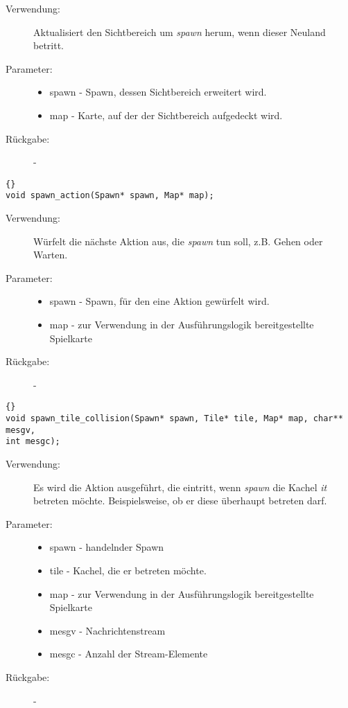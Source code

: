 \documentclass[11pt,a4paper,notitlepage]{report}
\begin{document}
	\begin{description}
		\item[Verwendung:] Aktualisiert den Sichtbereich um \textit{spawn} herum, wenn dieser Neuland betritt.
		\item[Parameter:] \hfill
		\begin{itemize}
			\item spawn - Spawn, dessen Sichtbereich erweitert wird.
			\item map - Karte, auf der der Sichtbereich aufgedeckt wird.
		\end{itemize}
		\item[Rückgabe:] -
	\end{description}
	
	
		\begin{lstlisting}[caption=spawn\_action]{}
void spawn_action(Spawn* spawn, Map* map);
		\end{lstlisting}
		
	\begin{description}
		\item[Verwendung:] Würfelt die nächste Aktion aus, die \textit{spawn} tun soll, z.B. Gehen oder Warten.
		\item[Parameter:] \hfill
		\begin{itemize}
			\item spawn - Spawn, für den eine Aktion gewürfelt wird.
			\item map - zur Verwendung in der Ausführungslogik bereitgestellte Spielkarte
		\end{itemize}
		\item[Rückgabe:] -
	\end{description}
	
	\begin{lstlisting}[caption=spawn\_tile\_collision]{}
void spawn_tile_collision(Spawn* spawn, Tile* tile, Map* map, char** mesgv, 
int mesgc);
		\end{lstlisting}
		
	\begin{description}
		\item[Verwendung:] Es wird die Aktion ausgeführt, die eintritt, wenn \textit{spawn} die Kachel \textit{it} betreten möchte. Beispielsweise, ob er diese überhaupt betreten darf.
		\item[Parameter:] \hfill
		\begin{itemize}
			\item spawn - handelnder Spawn
			\item tile - Kachel, die er betreten möchte.
			\item map - zur Verwendung in der Ausführungslogik bereitgestellte Spielkarte
			\item mesgv - Nachrichtenstream
			\item mesgc - Anzahl der Stream-Elemente
		\end{itemize}
		\item[Rückgabe:] -
	\end{description}
	
\end{document}
